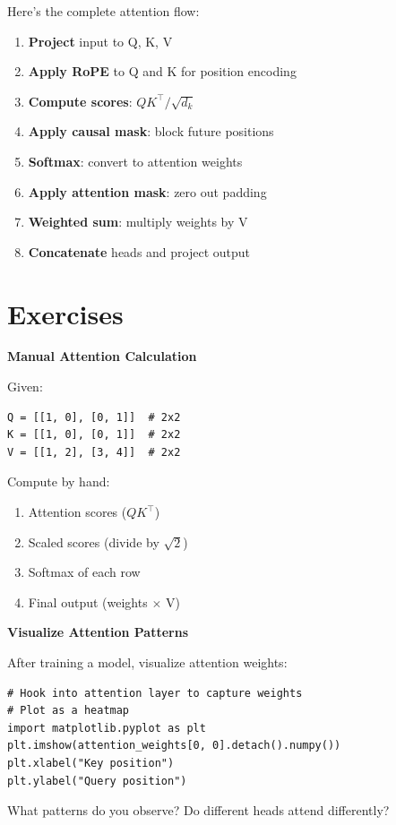 Here's the complete attention flow:

\begin{enumerate}
    \item \textbf{Project} input to Q, K, V
    \item \textbf{Apply RoPE} to Q and K for position encoding
    \item \textbf{Compute scores}: $QK^\top / \sqrt{d_k}$
    \item \textbf{Apply causal mask}: block future positions
    \item \textbf{Softmax}: convert to attention weights
    \item \textbf{Apply attention mask}: zero out padding
    \item \textbf{Weighted sum}: multiply weights by V
    \item \textbf{Concatenate} heads and project output
\end{enumerate}

\section{Exercises}

\begin{exercise}
\textbf{Manual Attention Calculation}

Given:
\begin{lstlisting}[style=python, numbers=none]
Q = [[1, 0], [0, 1]]  # 2x2
K = [[1, 0], [0, 1]]  # 2x2
V = [[1, 2], [3, 4]]  # 2x2
\end{lstlisting}

Compute by hand:
\begin{enumerate}
    \item Attention scores ($QK^\top$)
    \item Scaled scores (divide by $\sqrt{2}$)
    \item Softmax of each row
    \item Final output (weights $\times$ V)
\end{enumerate}
\end{exercise}

\begin{exercise}
\textbf{Visualize Attention Patterns}

After training a model, visualize attention weights:
\begin{lstlisting}[style=python, numbers=none]
# Hook into attention layer to capture weights
# Plot as a heatmap
import matplotlib.pyplot as plt
plt.imshow(attention_weights[0, 0].detach().numpy())
plt.xlabel("Key position")
plt.ylabel("Query position")
\end{lstlisting}

What patterns do you observe? Do different heads attend differently?
\end{exercise}


